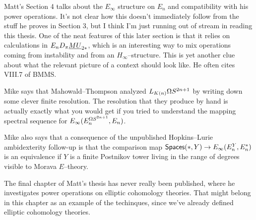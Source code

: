 Matt's Section 4 talks about the $E_\infty$ structure on $E_n$ and compatibility with his power operations.  It's not clear how this doesn't immediately follow from the stuff he proves in Section 3, but I think I'm just running out of stream in reading this thesis.  One of the neat features of this later section is that it relies on calculations in $E_n D_\pi \underline{\smash{MU}}_{2*}$, which is an interesting way to mix operations coming from instability and from an $H_\infty$--structure.  This is yet another clue about what the relevant picture of a context should look like.  He often cites VIII.7 of BMMS.

Mike says that Mahowald--Thompson analyzed $L_{K(n)} \Omega S^{2n+1}$ by writing down some clever finite resolution.  The resolution that they produce by hand is actually exactly what you would get if you tried to understand the mapping spectral sequence for $E_\infty(E_n^{\Omega S^{2n+1}}, E_n)$.

Mike also says that a consequence of the unpublished Hopkins--Lurie ambidexterity follow-up is that the comparison map $\mathsf{Spaces}(*, Y) \to E_\infty(E_n^Y, E_n^*)$ is an equivalence if $Y$ is a finite Postnikov tower living in the range of degrees visible to Morava $E$--theory.

The final chapter of Matt's thesis has never really been published, where he investigates power operations on elliptic cohomology theories.  That might belong in this chapter as an example of the techinques, since we've already defined elliptic cohomology theories.
